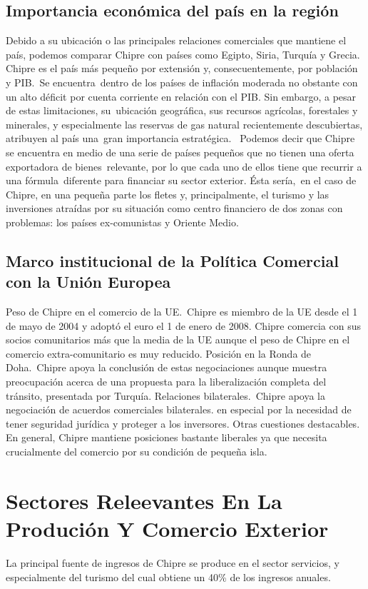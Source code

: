 \documentclass[a4paper,openright,12pt]{book}
\begin{document}
\subsection{Importancia económica del país en la región}

Debido a su ubicación  o las principales relaciones comerciales que mantiene el país,  podemos comparar Chipre con países como Egipto, Siria, Turquía y Grecia.
Chipre es el país más pequeño por extensión y, consecuentemente, por población y PIB. Se encuentra dentro de los países de inflación moderada no obstante con un alto déficit por cuenta corriente en relación con el PIB. Sin embargo, a pesar de estas limitaciones, su ubicación geográfica, sus recursos agrícolas, forestales y minerales, y especialmente las reservas de gas natural recientemente descubiertas, atribuyen al país una gran importancia estratégica. 
Podemos decir que Chipre se encuentra en medio de una serie de países pequeños que no tienen una oferta exportadora de bienes relevante, por lo que cada uno de ellos tiene que recurrir a una fórmula diferente para financiar su sector exterior. Ésta sería, en el caso de Chipre, en una pequeña parte los fletes y, principalmente, el turismo y las inversiones atraídas por su situación como centro financiero de dos zonas con problemas: los países ex-comunistas y Oriente Medio\cite{ICEXChipre18:online}.

\subsection{Marco institucional de la Política Comercial con la Unión Europea}

Peso de Chipre en el comercio de la UE. Chipre es miembro de la UE desde el 1 de mayo de 2004 y adoptó el euro el 1 de enero de 2008. Chipre comercia con sus socios comunitarios más que la media de la UE aunque el peso de Chipre en el comercio extra-comunitario es muy reducido.
Posición en la Ronda de Doha. Chipre apoya la conclusión de estas negociaciones aunque muestra preocupación acerca de una propuesta para la liberalización completa del tránsito, presentada por Turquía.
Relaciones bilaterales. Chipre apoya la negociación de acuerdos comerciales bilaterales. en especial por la necesidad de tener seguridad jurídica y proteger a los inversores.
Otras cuestiones destacables. En general, Chipre mantiene posiciones bastante liberales ya que necesita crucialmente del comercio por su condición de pequeña isla\cite{ICEXEspa63:online}.


\section{Sectores Releevantes En La Produción Y Comercio Exterior}
La principal fuente de ingresos de Chipre se produce en el sector servicios, y especialmente del turismo del cual obtiene un 40\% de los ingresos anuales\cite{OMCExamen}.
\end{document}

